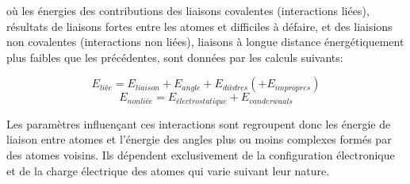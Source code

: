 où les énergies des contributions des liaisons covalentes (interactions liées), résultats de liaisons fortes entre les atomes et difficiles à défaire, et des liaisions non covalentes (interactions non liées), liaisons à longue distance énergétiquement plus faibles que les précédentes, sont données par les calculs suivants:

$$E_{liée} = E_{liaison} + E_{angle} + E_{dièdres} (+ E_{impropres})$$
$$E_{nonliée} = E_{électrostatique} + E_{vanderwaals}$$

Les paramètres influençant ces interactions sont regroupent donc les énergie de liaison entre atomes et l'énergie des angles plus ou moins complexes formés par des atomes voisins. Ils dépendent exclusivement de la configuration électronique et de la charge électrique des atomes qui varie suivant leur nature.




